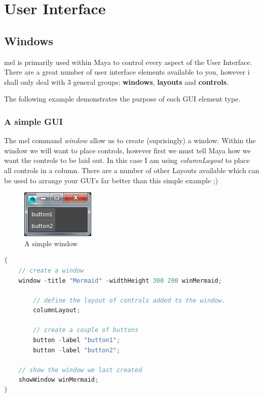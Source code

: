 
\chapter{User Interface}

\section{Windows}
mel is primarily used within Maya to control every aspect of the User Interface. There are a great number of user interface elements available to you, however i shall only deal with 3 general groups; \textbf{windows}, \textbf{layouts} and \textbf{controls}.

The following example demonstrates the purpose of each GUI element type.

\subsection{A simple GUI}
The mel command \textit{window} allow us to create (suprisingly) a window. Within the window we will want to place controls, however first we must tell Maya how we want the controls to be laid out. In this case I am using \textit{columnLayout} to place all controls in a column. There are a number of other Layouts available which can be used to arrange your GUI's far better than this simple example ;)

\begin{figure}[tbh]
	\centering
	\includegraphics[width=0.3\linewidth]{figures/GUI/simple_window}
	\caption{A simple window}
	\label{fig:simplewindow}
\end{figure}

\begin{lstlisting}[language=C++]
{
	// create a window
	window -title "Mermaid" -widthHeight 300 200 winMermaid;
	
		// define the layout of controls added to the window.
		columnLayout;
		
		// create a couple of buttons
		button -label "button1";
		button -label "button2";
	
	// show the window we last created
	showWindow winMermaid;
}
\end{lstlisting}

